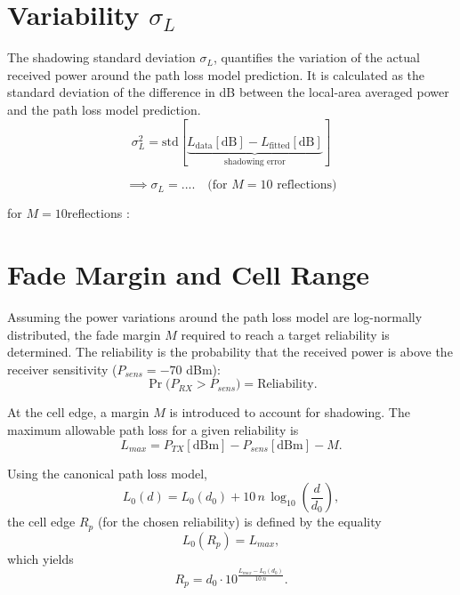 \section{Variability $\sigma_L$}
The shadowing standard deviation $\sigma_L$, quantifies the variation of the actual received power around the path loss model prediction. It is calculated as the standard deviation of the difference in dB between the local-area averaged power and the path loss model prediction.
\begin{equation}
	\sigma_L^2 = \mathrm{std} \left[ 
	\underbrace{L_{\mathrm{data}}[\mathrm{dB}] - L_{\mathrm{fitted}}[\mathrm{dB}]}_{\text{shadowing error}}
	\right]
\end{equation}

\begin{equation}
	\implies \boxed{\sigma_L = ....} \quad \text{(for $M = 10$ reflections)}
\end{equation}

for $M = 10 $reflections : 


\section{Fade Margin and Cell Range}
Assuming the power variations around the path loss model are log-normally distributed, the fade margin $M$ required to reach a target reliability is determined. The reliability is the probability that the received power is above the receiver sensitivity ($P_{sens} = -70$ dBm):
\begin{equation}
	\Pr\!\big(P_{RX} > P_{sens}\big) = \text{Reliability}.
\end{equation}


At the cell edge, a margin $M$ is introduced to account for shadowing. The maximum allowable path loss for a given reliability is
\begin{equation}
	L_{max} = P_{TX}[\text{dBm}] - P_{sens}[\text{dBm}] - M.
\end{equation}


Using the canonical path loss model,
\begin{equation}
	L_0(d) = L_0(d_0) + 10\,n\,\log_{10}\!\left(\frac{d}{d_0}\right),
\end{equation}
the cell edge $R_p$ (for the chosen reliability) is defined by the equality
\begin{equation}
	L_0(R_p) = L_{max},
\end{equation}
which yields
\begin{equation}
	R_p = d_0 \cdot 10^{\frac{L_{max} - L_0(d_0)}{10\,n}}.
\end{equation}

